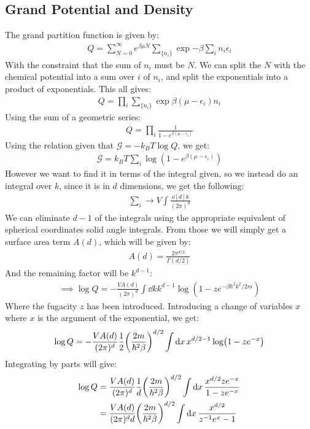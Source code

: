 \documentclass[12pt]{article}
\begin{document}
\subsection{Grand Potential and Density}
The grand partition function is given by:
\begin{align*}
  Q=\sum_{N=0}^\infty e^{\beta\mu N}\sum_{\{n_i\}}\exp{-\beta\sum_in_i\epsilon_i}
\end{align*}
With the constraint that the sum of $n_i$ must be $N$. We can split the $N$ with the chemical potential into a sum over $i$ of $n_i$, and split the exponentials into a product of exponentials. This all gives:
\begin{align*}
  Q=\prod_i\sum_{\{n_i\}}\exp{\beta(\mu-\epsilon_i)n_i}
\end{align*}
Using the sum of a geometric series:
\begin{align*}
  Q=\prod_i\frac1{1-e^{\beta(\mu-\epsilon_i)}}
\end{align*}
Using the relation given that $\mathcal{G}=-k_BT\log Q$, we get:
\begin{align*}
  \mathcal{G}=k_BT\sum_i\log(1-e^{\beta(\mu-\epsilon_i)})
\end{align*}
However we want to find it in terms of the integral given, so we instead do an integral over $k$, since it is in $d$ dimensions, we get the following:
\begin{align*}
  \sum_i\to V\int\frac{\dd[d]{k}}{(2\pi)^d}
\end{align*}
We can eliminate $d-1$ of the integrals using the appropriate equivalent of spherical coordinates solid angle integrals. From those we will simply get a surface area term $A(d)$, which will be given by:
\begin{align*}
  A(d)=\frac{2\pi^{d/2}}{\Gamma(d/2)}
\end{align*}
And the remaining factor will be $k^{d-1}$:
\begin{align*}
  \implies\log Q=-\frac{V A(d)}{(2\pi)^d}\int\dd{k}k^{d-1}
  \log(1-ze^{-\beta\hbar^2k^2/2m})
\end{align*}
Where the fugacity $z$ has been introduced. Introducing a change of variables $x$ where $x$ is the argument of the exponential, we get:
\begin{align*}
  \log Q=-\frac{V A(d)}{(2\pi)^d}\frac12\qty(\frac{2m}{\hbar^2\beta})^{d/2}
  \int\dd{x}x^{d/2-1}\log(1-ze^{-x})
\end{align*}
Integrating by parts will give:
\begin{align*}
  \log Q&=\frac{V A(d)}{(2\pi)^d}\frac1d\qty(\frac{2m}{\hbar^2\beta})^{d/2}
  \int\dd{x}\frac{x^{d/2}ze^{-x}}{1-ze^{-x}}\\
  &=\frac{V A(d)}{(2\pi)^dd}\qty(\frac{2m}{\hbar^2\beta})^{d/2}
  \int\dd{x}\frac{x^{d/2}}{z^{-1}e^x-1}\\
\end{align*}
\end{document}

